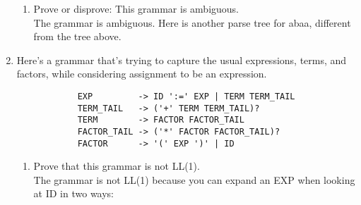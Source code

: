 \documentclass{article}
\begin{document}
\begin{enumerate}
\begin{enumerate}
            \item Prove or disprove: This grammar is ambiguous. \\
                The grammar is ambiguous. Here is another parse tree for abaa, different from the tree above.
        \end{enumerate}
    \pagebreak
    \item Here's a grammar that's trying to capture the usual expressions, terms, and factors, while considering assignment to be an expression.
        \begin{verbatim}
            EXP         -> ID ':=' EXP | TERM TERM_TAIL
            TERM_TAIL   -> ('+' TERM TERM_TAIL)?
            TERM        -> FACTOR FACTOR_TAIL
            FACTOR_TAIL -> ('*' FACTOR FACTOR_TAIL)?
            FACTOR      -> '(' EXP ')' | ID
        \end{verbatim}
        \begin{enumerate}
            \item Prove that this grammar is not LL(1). \\
            The grammar is not LL(1) because you can expand an EXP when looking at ID in two ways:

\end{enumerate}
\end{enumerate}
\end{document}
